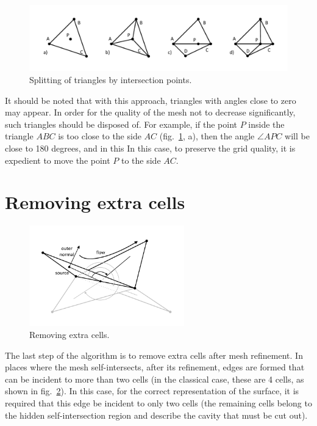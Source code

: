 \documentclass[
11pt,%
tightenlines,%
twoside,%
onecolumn,%
nofloats,%
nobibnotes,%
nofootinbib,%
superscriptaddress,%
noshowpacs,%
centertags]%
{revtex4}
\begin{document}
\begin{figure}[h]
\includegraphics[width=1.0\textwidth]{pics/pic_split_s.pdf}
\caption{Splitting of triangles by intersection points.}\label{fig:pic_split_s}
\end{figure}

It should be noted that with this approach, triangles with angles close to zero may appear.
In order for the quality of the mesh not to decrease significantly, such triangles should be disposed of.
For example, if the point $P$ inside the triangle $ABC$ is too close to the side $AC$ (fig.~\ref{fig:pic_split_s}, a), then the angle $\angle APC$ will be close to 180 degrees, and in this In this case, to preserve the grid quality, it is expedient to move the point $P$ to the side $AC$.

\section{Removing extra cells}

\begin{figure}[h]
\includegraphics[width=0.6\textwidth]{pics/pic_del_extra_s.pdf}
\caption{Removing extra cells.}\label{fig:pic_del_extra_s}
\end{figure}

The last step of the algorithm is to remove extra cells after mesh refinement.
In places where the mesh self-intersects, after its refinement, edges are formed that can be incident to more than two cells (in the classical case, these are 4 cells, as shown in fig.~\ref{fig:pic_del_extra_s}).
In this case, for the correct representation of the surface, it is required that this edge be incident to only two cells (the remaining cells belong to the hidden self-intersection region and describe the cavity that must be cut out).
\end{document}
